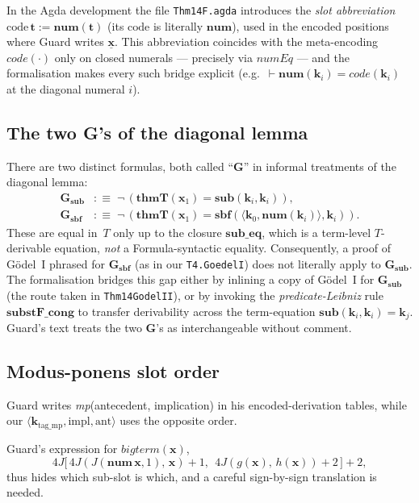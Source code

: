 \documentclass[11pt]{article}
\theoremstyle{plain}
\theoremstyle{definition}
\theoremstyle{remark}
\newcommand{\code}[1]{\mathit{code}(#1)}
\newcommand{\sub}{\mathbf{sub}}
\newcommand{\sbf}{\mathbf{sbf}}
\newcommand{\thmT}{\mathbf{thmT}}
\newcommand{\num}{\mathbf{num}}
\newcommand{\seq}[1]{\langle #1 \rangle}
\begin{document}
In the Agda development the file \verb|Thm14F.agda| introduces the
\emph{slot abbreviation} $\mathrm{code}\,\mathbf{t} := \num(\mathbf{t})$
(its $\mathrm{code}$ is literally $\num$), used in the encoded
positions where Guard writes $\underline{\mathbf{x}}$.  This
abbreviation coincides with the meta-encoding $\code{\cdot}$ only on
closed numerals --- precisely via $\mathit{numEq}$ --- and the
formalisation makes every such bridge explicit
(e.g.\ $\vdash \num(\mathbf{k}_i) = \code{\mathbf{k}_i}$ at the
diagonal numeral $i$).

\subsection{The two G's of the diagonal lemma}

There are two distinct formulas, both called ``$\mathbf{G}$'' in
informal treatments of the diagonal lemma:
\begin{align*}
\mathbf{G}_{\sub}  &:\equiv\; \neg\,(\thmT(\mathbf{x}_1) = \sub(\mathbf{k}_i, \mathbf{k}_i)), \\
\mathbf{G}_{\sbf}  &:\equiv\; \neg\,(\thmT(\mathbf{x}_1) = \sbf(\seq{\mathbf{k}_0, \num(\mathbf{k}_i)}, \mathbf{k}_i)).
\end{align*}
These are equal in~$T$ only up to the closure $\mathbf{sub\_eq}$,
which is a term-level $T$-derivable equation, \emph{not} a
Formula-syntactic equality.  Consequently, a proof of G\"odel~I phrased
for $\mathbf{G}_{\sbf}$ (as in our \verb|T4.GoedelI|) does not
literally apply to $\mathbf{G}_{\sub}$.  The formalisation bridges this
gap either by inlining a copy of G\"odel~I for $\mathbf{G}_{\sub}$ (the
route taken in \verb|Thm14GodelII|), or by invoking the
\emph{predicate-Leibniz} rule $\mathbf{substF\_cong}$ to transfer
derivability across the term-equation $\sub(\mathbf{k}_i, \mathbf{k}_i)
= \mathbf{k}_j$.  Guard's text treats the two $\mathbf{G}$'s as
interchangeable without comment.

\subsection{Modus-ponens slot order}

{\sloppy Guard writes \emph{mp}(antecedent, implication) in
his encoded-derivation tables, while our
$\seq{\mathbf{k}_{\mathrm{tag\_mp}}, \mathrm{impl}, \mathrm{ant}}$ uses
the opposite order.\par}  Guard's expression for
$\mathit{bigterm}(\mathbf{x})$,
\[
4J\bigl[\,4J(J(\num\,\mathbf{x},1),\, \mathbf{x})+1,\ \ 4J(g(\mathbf{x}),\, h(\mathbf{x}))+2\,\bigr]+2,
\]
thus hides which sub-slot is which, and a careful sign-by-sign
translation is needed.
\end{document}
